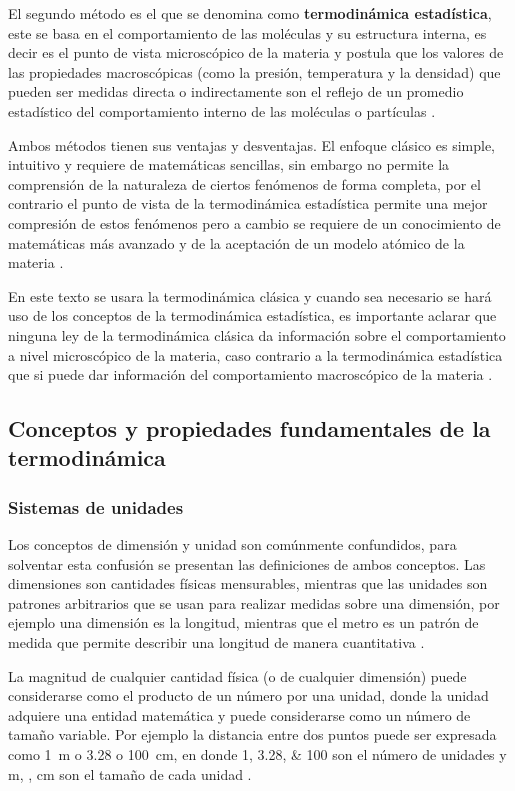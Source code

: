 \documentclass[master.tex]{subfiles}
\begin{document}
    El segundo método es el que se denomina como \textbf{termodinámica estadística}, este se basa en el comportamiento de las moléculas y su estructura interna, es decir es el punto de vista microscópico de la materia y postula que los valores de las propiedades macroscópicas (como la presión, temperatura y la densidad) que pueden ser medidas directa o indirectamente son el reflejo de un promedio estadístico del comportamiento interno de las moléculas o partículas \parencites{faires}{wark}.

    Ambos métodos tienen sus ventajas y desventajas. El enfoque clásico es simple, intuitivo y requiere de matemáticas sencillas, sin embargo no permite la comprensión de la naturaleza de ciertos fenómenos de forma completa, por el contrario el punto de vista de la termodinámica estadística permite una mejor compresión de estos fenómenos pero a cambio se requiere de un conocimiento de matemáticas más avanzado y de la aceptación de un modelo atómico de la materia \parencite{faires}. 

    En este texto se usara la termodinámica clásica y cuando sea necesario se hará uso de los conceptos de la termodinámica estadística, es importante aclarar que ninguna ley de la termodinámica clásica da información sobre el comportamiento a nivel microscópico de la materia, caso contrario a la termodinámica estadística que si puede dar información del comportamiento macroscópico de la materia \parencite{smith-vanness}.

    \subsection{Conceptos y propiedades fundamentales de la termodinámica}

    \subsubsection{Sistemas de unidades}

    Los conceptos de dimensión y unidad son comúnmente confundidos, para solventar esta confusión se presentan las definiciones de ambos conceptos. Las dimensiones son cantidades físicas mensurables, mientras que las unidades son patrones arbitrarios que se usan para realizar medidas sobre una dimensión, por ejemplo una dimensión es la longitud, mientras que el metro es un patrón de medida que permite describir una longitud de manera cuantitativa \parencites{rubenstein}{doran}.


    La magnitud de cualquier cantidad física (o de cualquier dimensión) puede considerarse como el producto de un número por una unidad, donde la unidad adquiere una entidad matemática y puede considerarse como un número de tamaño variable. Por ejemplo la distancia entre dos puntos puede ser expresada como \qty{1}{\metre} o \qty{3.28}{\feet} o \qty{100}{\centi\metre}, en donde \numlist{1;3.28;100} son el número de unidades y \unit{m}, \unit{\feet}, \unit{\centi\metre} son el tamaño de cada unidad \parencite{coulson1}.
\end{document}
